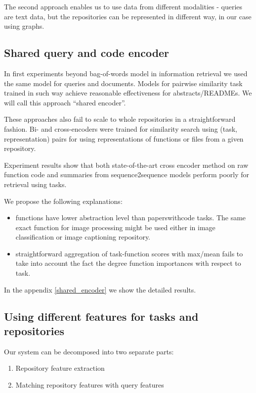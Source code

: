 \documentclass[longabstract,mgr,english]{iithesis}
\begin{document}
The second approach enables us to use data from different modalities - queries
are text data, but the repositories can be represented in different way, in our
case using graphs.

\label{general_ideas}

\subsection{Shared query and code encoder}
In first experiments beyond bag-of-words model in information retrieval we used the same model for queries and
documents. Models for pairwise similarity task trained in such way achieve reasonable effectiveness
for abstracts/READMEs. We will call this approach ``shared encoder''.

These approaches also fail to scale to whole repositories in a straightforward
fashion. Bi- and cross-encoders  were trained for similarity search using (task, representation) pairs for
using representations of functions or files from a given repository. 

Experiment results show that both state-of-the-art cross encoder method on raw function
code and summaries from sequence2sequence models perform poorly for retrieval
using tasks.

We propose the following explanations:

\begin{itemize}
\item functions have lower abstraction level than paperswithcode tasks. The same
  exact function for image processing might be used either in image
  classification or image captioning repository.
\item straightforward aggregation of task-function scores with max/mean fails to
  take into account the fact the degree function importances with respect to task. 
\end{itemize}

In the appendix \ref{shared_encoder} we show the detailed results.

\subsection{Using different features for tasks and repositories}

Our system can be decomposed into two separate parts:

\begin{enumerate}

\item Repository feature extraction

\item Matching repository features with query features

\end{enumerate}
\end{document}
